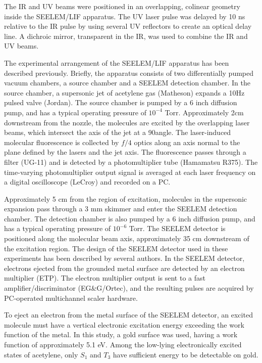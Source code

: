 \documentclass[12pt]{mitthesis}
\begin{document}
The IR and UV beams were positioned in an overlapping, colinear
geometry inside the SEELEM/LIF apparatus.  The UV laser pulse was
delayed by 10 ns relative to the IR pulse by using several UV
reflectors to create an optical delay line.  A dichroic mirror,
transparent in the IR, was used to combine the IR and UV beams.

The experimental arrangement of the SEELEM/LIF apparatus has been
described previously.    Briefly, the apparatus consists
of two differentially pumped vacuum chambers, a source chamber and a
SEELEM detection chamber.  In the source chamber, a supersonic jet of
acetylene gas (Matheson) expands a 10Hz pulsed valve (Jordan).  The
source chamber is pumped by a 6 inch diffusion pump, and has a typical
operating pressure of $10^{-4}$ Torr.  Approximately 2cm downstream
from the nozzle, the molecules are excited by the overlapping laser
beams, which intersect the axis of the jet at a 90\degrees angle.  The
laser-induced molecular fluorescence is collected by $f/4$ optics
along an axis normal to the plane defined by the lasers and the jet
axis.  The fluorescence passes through a filter (UG-11) and is
detected by a photomultiplier tube (Hamamatsu R375).  The time-varying
photomultiplier output signal is averaged at each laser frequency on a
digital oscilloscope (LeCroy) and recorded on a PC.

Approximately 5 cm from the region of excitation, molecules in the
supersonic expansion pass through a 3 mm skimmer and enter the SEELEM
detection chamber.  The detection chamber is also pumped by a 6 inch
diffusion pump, and has a typical operating pressure of $10^{-6}$
Torr.  The SEELEM detector is positioned along the molecular beam
axis, approximately 35 cm downstream of the excitation region.  The
design of the SEELEM detector used in these experiments has been
described by several authors.  In the SEELEM detector, electrons
ejected from the grounded metal surface are detected by an electron
multiplier (ETP).  The electron multiplier output is sent to a fast
amplifier/discriminator (EG\&G/Ortec), and the resulting pulses are
acquired by PC-operated multichannel scaler hardware.

To eject an electron from the metal surface of the SEELEM detector, an
excited molecule must have a vertical electronic excitation energy
exceeding the work function of the metal.  In this study, a gold
surface was used, having a work function of approximately 5.1 eV.
Among the low-lying electronically excited states of acetylene, only
$S_1$ and $T_3$ have sufficient energy to be detectable on gold.
\end{document}

